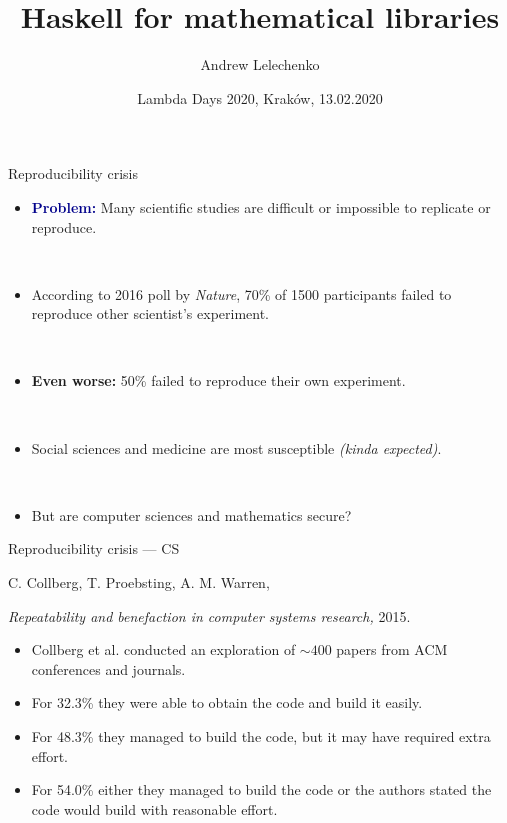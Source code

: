 \documentclass[handout]{beamer}
\title{Haskell for mathematical libraries}
\author[Andrew Lelechenko]{Andrew Lelechenko}
\institute[Barclays]{Barclays, London}
\date{Lambda Days 2020, Kraków, 13.02.2020}
\def\problem{\textcolor{darkblue}{\bf Problem:} }
\begin{document}
\begin{frame}
  \titlepage
\end{frame}

\begin{frame}{Reproducibility crisis}

\begin{itemize}[<+->]
\item \problem
  Many scientific studies are difficult or impossible to replicate or reproduce. \par~
\item
  According to 2016 poll by {\em Nature},
  70\% of 1500 participants
  failed to reproduce other scientist's experiment. \par~
\item
  {\bf Even worse:}
  50\% failed to reproduce their own experiment. \par~
\item
  Social sciences and medicine are most susceptible {\em (kinda expected)}. \par~
\item
  But are computer sciences and mathematics secure?
\end{itemize}

\end{frame}

\begin{frame}{Reproducibility crisis --- CS}

\centerline{C. Collberg, T. Proebsting, A. M. Warren,}
\centerline{{\em Repeatability and benefaction in computer systems research,} 2015.}

\bigskip

\begin{itemize}[<+->]
\item
  Collberg et al. conducted an exploration of $\sim 400$ papers
  from ACM conferences and journals.
\item
  For 32.3\% they were able to obtain the code
  and build it easily.
\item
  For 48.3\% they managed to build the code,
  but it may have required extra effort.
\item
  For 54.0\% either they managed to build the code
  or the authors stated the code would build with reasonable effort.
\end{itemize}

\end{frame}
\end{document}
